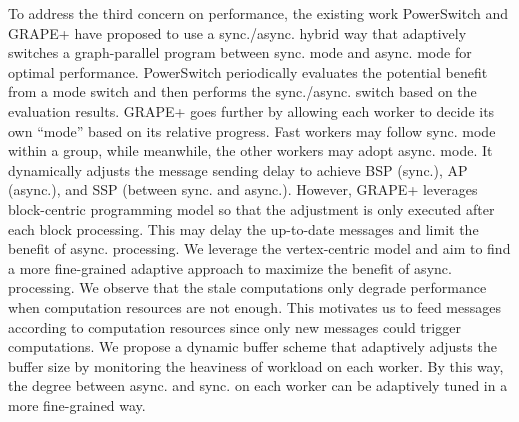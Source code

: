 To address the third concern on performance, the existing work PowerSwitch \cite{Xie2015SYNC} and GRAPE+ \cite{Fan2018Adaptive} have proposed to use a sync./async. hybrid way that adaptively switches a graph-parallel program between sync. mode and async. mode for optimal performance. PowerSwitch \cite{Xie2015SYNC} periodically evaluates the potential benefit from a mode switch and then performs the sync./async. switch based on the evaluation results. GRAPE+ \cite{Fan2018Adaptive} goes further by allowing each worker to decide its own ``mode'' based on its relative progress. Fast workers may follow sync. mode within a group, while meanwhile, the other workers may adopt async. mode. It dynamically adjusts the message sending delay to achieve BSP (sync.), AP (async.), and SSP (between sync. and async.). However, GRAPE+ leverages block-centric programming model so that the adjustment is only executed after each block processing. This may delay the up-to-date messages and limit the benefit of async. processing. We leverage the vertex-centric model and aim to find a more fine-grained adaptive approach to maximize the benefit of async. processing. We observe that the stale computations only degrade performance when computation resources are not enough. This motivates us to feed messages according to computation resources since only new messages could trigger computations. We propose a dynamic buffer scheme that adaptively adjusts the buffer size by monitoring the heaviness of workload on each worker. By this way, the degree between async. and sync. on each worker can be adaptively tuned in a more fine-grained way.



